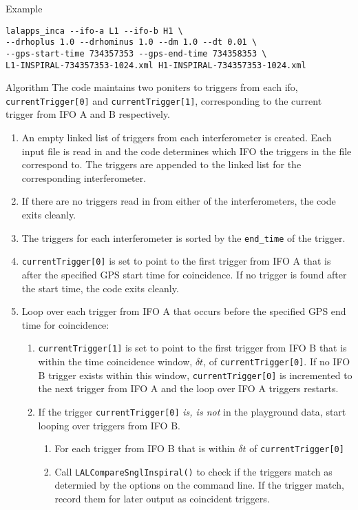 \begin{entry}
\item[Example]
\begin{verbatim}
lalapps_inca --ifo-a L1 --ifo-b H1 \
--drhoplus 1.0 --drhominus 1.0 --dm 1.0 --dt 0.01 \
--gps-start-time 734357353 --gps-end-time 734358353 \
L1-INSPIRAL-734357353-1024.xml H1-INSPIRAL-734357353-1024.xml
\end{verbatim}

\item[Algorithm]
The code maintains two poniters to triggers from each ifo,
\texttt{currentTrigger[0]} and \texttt{currentTrigger[1]}, corresponding to
the current trigger from IFO A and B respectively.

\begin{enumerate}
\item An empty linked list of triggers from each interferometer is created.
Each input file is read in and the code determines which IFO the triggers in
the file correspond to. The triggers are appended to the linked list for the
corresponding interferometer.

\item If there are no triggers read in from either of the interferometers,
the code exits cleanly.

\item The triggers for each interferometer is sorted by the \texttt{end\_time}
of the trigger.

\item \texttt{currentTrigger[0]} is set to point to the first trigger from IFO
A that is after the specified GPS start time for coincidence. If no trigger is
found after the start time, the code exits cleanly.

\item Loop over each trigger from IFO A that occurs before the specified GPS
end time for coincidence:
\begin{enumerate}
\item \texttt{currentTrigger[1]} is set to point to the first trigger from IFO
B that is within the time coincidence window, $\delta t$, of
\texttt{currentTrigger[0]}. If no IFO B trigger exists within this window,
\texttt{currentTrigger[0]} is incremented to the next trigger from IFO A and
the loop over IFO A triggers restarts.

\item If the trigger \texttt{currentTrigger[0]} \emph{is, is not} in the
playground data, start looping over triggers from IFO B.
\begin{enumerate}
\item For each trigger from IFO B that is within $\delta t$ of
\texttt{currentTrigger[0]}
\item Call \texttt{LALCompareSnglInspiral()} to check if the triggers match as
determied by the options on the command line. If the trigger match, record
them for later output as coincident triggers.
\end{enumerate}


\end{enumerate}
\end{enumerate}
\end{entry}
